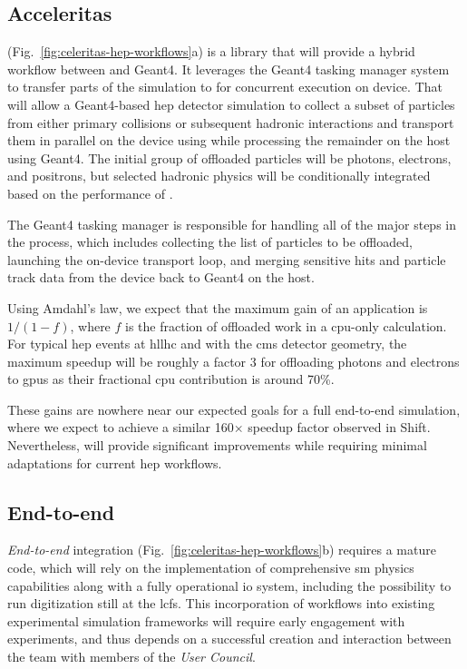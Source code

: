 \subsection{Acceleritas}
\label{sec:acceleritas}

\acceleritas (Fig.~\ref{fig:celeritas-hep-workflows}a) is a library that will
provide a hybrid workflow between \celeritas and Geant4. It leverages the Geant4
tasking manager system to transfer parts of the simulation to \celeritas for
concurrent execution on device. That will allow a Geant4-based \ac{hep} detector
simulation to collect a subset of particles from either primary collisions or
subsequent hadronic interactions and transport them in parallel on the device
using \celeritas while processing the remainder on the host using Geant4.  The
initial group of offloaded particles will be photons, electrons, and positrons,
but selected hadronic physics will be conditionally integrated based on the
performance of \acceleritas.

The Geant4 tasking manager is responsible for handling all of the major steps in
the process, which includes collecting the list of particles to be offloaded,
launching the \celeritas on-device transport loop, and merging sensitive hits
and particle track data from the device back to Geant4 on the host.

Using Amdahl's law, we expect that the maximum gain of an \acceleritas
application is $1/(1-f)$, where $f$ is the fraction of offloaded work in a
\ac{cpu}-only calculation.  For typical \ac{hep} events at \acs{hllhc} and with
the \ac{cms} detector geometry, the maximum speedup will be roughly a factor 3
for offloading photons and electrons to \acp{gpu} as their fractional \ac{cpu}
contribution is around 70\%.

These gains are nowhere near our expected goals for a full end-to-end \celeritas
simulation, where we expect \celeritas to achieve a similar 160$\times$ speedup
factor observed in Shift. Nevertheless, \acceleritas will provide significant
improvements while requiring minimal adaptations for current \ac{hep} workflows.

\subsection{End-to-end \celeritas}
\label{sec:end-to-end}

\emph{End-to-end} \celeritas integration
(Fig.~\ref{fig:celeritas-hep-workflows}b) requires a mature \celeritas code,
which will rely on the implementation of comprehensive \ac{sm} physics
capabilities along with a fully operational \ac{io} system, including the
possibility to run digitization still at the \acp{lcf}. This incorporation of
\celeritas workflows into existing experimental simulation frameworks will
require early engagement with experiments, and thus depends on a successful
creation and interaction between the \celeritas team with members of the
\emph{User Council}.

